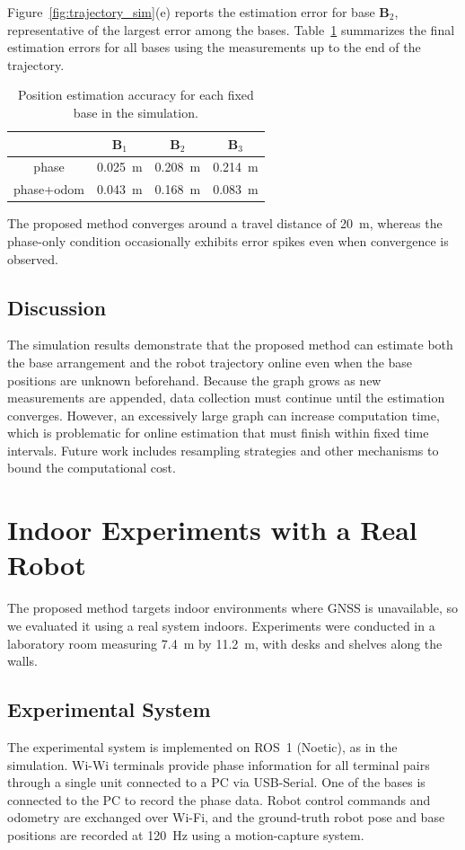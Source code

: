 \documentclass[conference]{IEEEtran}
\begin{document}
Figure~\ref{fig:trajectory_sim}(e) reports the estimation error for base $\mathbf{B}_2$, representative of the largest error among the bases.
Table~\ref{tab:base_error} summarizes the final estimation errors for all bases using the measurements up to the end of the trajectory.
\begin{table}
    \centering
    \caption{Position estimation accuracy for each fixed base in the simulation.}
    \begin{tabular}{|c|c|c|c|}
    \hline
    & $\mathbf{B}_1$ & $\mathbf{B}_2$ & $\mathbf{B}_3$ \\
    \hline
    phase & 0.025~m & 0.208~m & 0.214~m \\
    \hline
    phase+odom & 0.043~m & 0.168~m & 0.083~m \\
    \hline
    \end{tabular}
    \label{tab:base_error}
\end{table}

The proposed method converges around a travel distance of 20~m, whereas the phase-only condition occasionally exhibits error spikes even when convergence is observed.

\subsection{Discussion}
The simulation results demonstrate that the proposed method can estimate both the base arrangement and the robot trajectory online even when the base positions are unknown beforehand.
Because the graph grows as new measurements are appended, data collection must continue until the estimation converges.
However, an excessively large graph can increase computation time, which is problematic for online estimation that must finish within fixed time intervals.
Future work includes resampling strategies and other mechanisms to bound the computational cost.

\section{Indoor Experiments with a Real Robot}
The proposed method targets indoor environments where GNSS is unavailable, so we evaluated it using a real system indoors.
Experiments were conducted in a laboratory room measuring 7.4~m by 11.2~m, with desks and shelves along the walls.

\subsection{Experimental System}
The experimental system is implemented on ROS~1 (Noetic), as in the simulation.
Wi-Wi terminals provide phase information for all terminal pairs through a single unit connected to a PC via USB-Serial.
One of the bases is connected to the PC to record the phase data.
Robot control commands and odometry are exchanged over Wi-Fi, and the ground-truth robot pose and base positions are recorded at 120~Hz using a motion-capture system.
\end{document}
